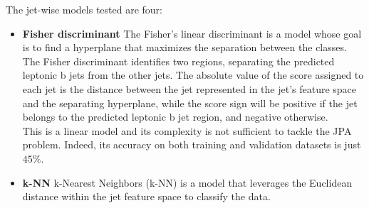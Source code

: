 The jet-wise models tested are four: 
\begin{itemize}
    \item \textbf{Fisher discriminant} The Fisher's linear discriminant \cite{FISHER1936THEPROBLEMS} is a model whose goal is to find a hyperplane that maximizes the separation between the classes.\\
    The Fisher discriminant identifies two regions, separating the predicted leptonic b jets from the other jets. The absolute value of the score assigned to each jet is the distance between the jet represented in the jet's feature space and the separating hyperplane, while the score sign will be positive if the jet belongs to the predicted leptonic b jet region, and negative otherwise.
    \\
    This is a linear model and its complexity is not sufficient to tackle the JPA problem. Indeed, its accuracy on both training and validation datasets is just $45\%$.
    \item \textbf{k-NN}
    k-Nearest Neighbors (k-NN) \cite{Cunningham2020K-NearestExamples} is a model that leverages the Euclidean distance within the jet feature space to classify the data.
    

\end{itemize}
